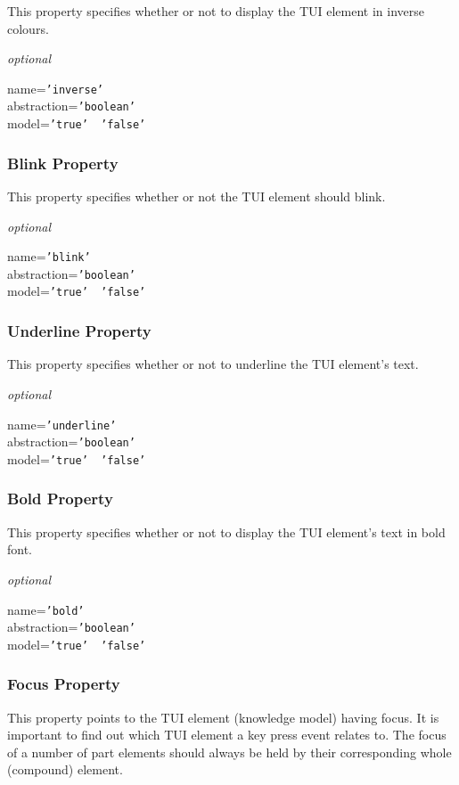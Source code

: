 This property specifies whether or not to display the TUI element in inverse
colours.

\emph{optional}

name=\texttt{'inverse'}\\
abstraction=\texttt{'boolean'}\\
model=\texttt{'true' \vline\ 'false'}

\subsubsection{Blink Property}

This property specifies whether or not the TUI element should blink.

\emph{optional}

name=\texttt{'blink'}\\
abstraction=\texttt{'boolean'}\\
model=\texttt{'true' \vline\ 'false'}

\subsubsection{Underline Property}

This property specifies whether or not to underline the TUI element's text.

\emph{optional}

name=\texttt{'underline'}\\
abstraction=\texttt{'boolean'}\\
model=\texttt{'true' \vline\ 'false'}

\subsubsection{Bold Property}

This property specifies whether or not to display the TUI element's text in
bold font.

\emph{optional}

name=\texttt{'bold'}\\
abstraction=\texttt{'boolean'}\\
model=\texttt{'true' \vline\ 'false'}

\subsubsection{Focus Property}

This property points to the TUI element (knowledge model) having focus. It is
important to find out which TUI element a key press event relates to. The focus
of a number of part elements should always be held by their corresponding
whole (compound) element.

